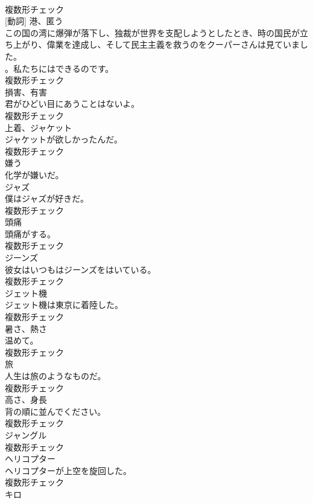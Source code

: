 \documentclass[8pt]{extreport}
\begin{document}
\begin{CJK}{UTF8}{min}
\\	複数形チェック
\\	[名詞] [動詞]	港、匿う	
\\	この国の湾に爆弾が落下し、独裁が世界を支配しようとしたとき、時の国民が立ち上がり、偉業を達成し、そして民主主義を救うのをクーパーさんは見ていました。
\\	。私たちにはできるのです。	
\\	複数形チェック
\\	[名詞]	損害、有害	
\\	君がひどい目にあうことはないよ。	
\\	複数形チェック
\\	[名詞]	上着、ジャケット	
\\	ジャケットが欲しかったんだ。	
\\	複数形チェック
\\	[動詞]	嫌う	
\\	化学が嫌いだ。	
\\	[名詞]	ジャズ	
\\	僕はジャズが好きだ。	
\\	複数形チェック
\\	[名詞]	頭痛	
\\	頭痛がする。	
\\	複数形チェック
\\	[名詞]	ジーンズ	
\\	彼女はいつもはジーンズをはいている。	
\\	複数形チェック
\\	[名詞]	ジェット機	
\\	ジェット機は東京に着陸した。	
\\	複数形チェック
\\	[名詞]	暑さ、熱さ	
\\	温めて。	
\\	複数形チェック
\\	[名詞]	旅	
\\	人生は旅のようなものだ。	
\\	複数形チェック
\\	[名詞]	高さ、身⻑	
\\	背の順に並んでください。	
\\	複数形チェック
\\	[名詞]	ジャングル	
\\	複数形チェック
\\	[名詞]	ヘリコプター	
\\	ヘリコプターが上空を旋回した。	
\\	複数形チェック
\\	[名詞]	キロ	

\end{CJK}
\end{document}
